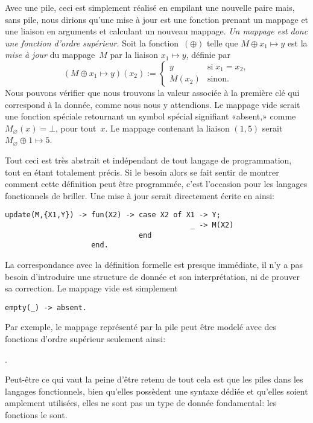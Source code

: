 Avec une pile, ceci est simplement réalisé en empilant une nouvelle
paire mais, sans pile, nous dirions qu'une mise à jour est une
fonction prenant un mappage et une liaison en arguments et calculant
un nouveau mappage. \emph{Un mappage est donc une fonction d'ordre
  supérieur.} Soit la fonction~\((\oplus)\) telle que \(M
\mathrel{\oplus} x_1 \mapsto y\) est la \emph{mise à jour} du
mappage~\(M\) par la liaison \(x_1 \mapsto y\), définie par
\begin{equation*}
(M \mathrel{\oplus} x_1 \mapsto y)(x_2) :=
\begin{cases}
  y      & \text{si} \; x_1 = x_2,\\
  M(x_2) & \text{sinon.}
\end{cases}
\end{equation*}
Nous pouvons vérifier que nous trouvons la valeur associée à la
première clé qui correspond à la donnée, comme nous nous y
attendions. Le mappage vide serait une fonction spéciale retournant un
symbol spécial signifiant «absent,» comme \(M_\varnothing(x) = \bot\),
pour tout~\(x\). Le mappage contenant la liaison \((1,5)\) serait
\(M_\varnothing \mathrel{\oplus} 1 \mapsto 5\).

Tout ceci est très abstrait et indépendant de tout langage de
programmation, tout en étant totalement précis. Si le besoin alors se
fait sentir de montrer comment cette définition peut être programmée,
c'est l'occasion pour les langages fonctionnels de briller. Une mise à
jour serait directement écrite en \Erlang ainsi:
\begin{verbatim}
update(M,{X1,Y}) -> fun(X2) -> case X2 of X1 -> Y; 
                                           _ -> M(X2) 
                               end
                    end.
\end{verbatim}
La correspondance avec la définition formelle est presque immédiate,
il n'y a pas besoin d'introduire une structure de donnée et son
interprétation, ni de prouver sa correction. Le mappage vide est
simplement
\begin{verbatim}
empty(_) -> absent.
\end{verbatim}
Par exemple, le mappage représenté par la pile
\erlcode{[\{a,0\},\{b,1\},\{a,5\}]} peut être modelé avec des
fonctions d'ordre supérieur seulement ainsi:
\begin{center}
.
\end{center}
Peut-être ce qui vaut la peine d'être retenu de tout cela est que les
piles dans les langages fonctionnels, bien qu'elles possèdent une
syntaxe dédiée et qu'elles soient amplement utilisées, elles ne sont
pas un type de donnée fondamental: les fonctions le sont.

